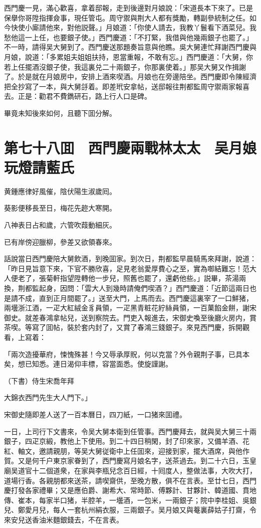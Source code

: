 西門慶一見，滿心歡喜，拿着邸報，走到後邊對月娘說：「宋道長本下來了。已是保擧你哥陞指揮僉事，現任管屯。周守禦與荆大人都有獎勵，轉副參統制之任。如今快使小廝請他來，對他説聲。」月娘道：「你使人請去，我教丫鬟看下酒菜兒。我愁他這一上任，也要銀子使。」西門慶道：「不打緊，我借與他幾兩銀子也罷了。」不一時，請得吴大舅到了。西門慶送那題奏旨意與他瞧。吳大舅連忙拜謝西門慶與月娘，說道：「多累姐夫姐姐扶持，恩當重報，不敢有忘。」西門慶道：「大舅，你若上任擺酒沒銀子使，我這裏兑二十兩銀子，你那裏使着。」那吴大舅又作揖謝了。於是就在月娘房中，安排上酒來喫酒。月娘也在旁邊陪坐。西門慶即令陳經濟把全抄寫了一本，與大舅㧱着。即差玳安拿帖，送邸報往荆都監周守禦兩家報喜去。正是：勸君不費鐫研石，路上行人口是碑。

畢竟未知後來如何，且聽下囬分解。

\chapter*{第七十八囬　西門慶兩戰林太太　吴月娘玩燈請藍氏}

黄鍾應律好風催，陰伏陽生淑歲囘。

葵影便移長至日，梅花先趂大寒開。

八神表日占和歲，六管吹葭動細灰。

已有岸傍迎臘柳，參差又欲領春來。

話說當日西門慶陪大舅飲酒，到晚囬家。到次日，荆都監早晨騎馬來拜謝，說道：「昨日見旨意下來，下官不勝欣喜，足見老翁愛厚費心之至，實為啣結難忘！范大人便老了，張菊軒指望陞轉他一步兒，照舊也罷了，還虧他些。」説畢，茶湯兩換，荆都監起身，因問：「雲大人到幾時請俺們喫酒？」西門慶道：「近節這兩日也是請不成，直到正月間罷了。」送至大門，上馬而去。西門慶這裏宰了一口鮮猪，兩壜浙江酒，一疋大紅絨金豸員領，一疋黑青粧花紵絲員領，一百菓餡金餅，謝宋御史。就差春鴻拿帖兒，送到察院去。門吏入報進去，宋御史喚至後廳火房内，賞茶喫。等寫了囬帖，裝於套内封了，又賞了春鴻三錢銀子。來見西門慶，拆開觀看，上寫着：

「兩次造擾華府，悚愧殊甚！今又辱承厚貺，何以克當？外令親荆子事，已具本矣，想已知悉。連日渴仰丰標，容當面悉。使旋謹謝。

（下書）侍生宋喬年拜

大錦衣西門先生大人門下。」

宋御史隨即差人送了一百本曆日，四刀紙，一口猪來囬禮。

一日，上司行下文書來，令吴大舅本衛到任管事。西門慶拜去，就與吴大舅三十兩銀子，四疋京緞，教他上下使用。到二十四日稍閑，封了印來家，又備羊酒、花紅、軸文，邀請親朋，等吴大舅従衛中上任囬來，迎接到家，擺大酒席，與他作賀。又是何千户東京家眷到了，西門慶寫月娘名字，送茶過去。到二十六日，玉皇廟吴道官十二個道衆，在家與李瓶兒念百日經，十囘度人，整做法事，大吹大打，道場行香。各親朋都來送茶，請喫齋供，至晚方散，俱不在言表。至廿七日，西門慶打發各家禮畢；又是應伯爵、謝希大、常時節、傅夥計、甘夥計、韓道國、賁地傳、崔本，每家半口猪，半腔羊，一壜酒，一包米，一兩銀子；院中李桂姐、吳銀兒、鄭愛月兒，每人一套杭州絹衣服，三兩銀子。吴月娘又與菴裏薛姑子打齋，令來安兒送香油米麵銀錢去，不在言表。

